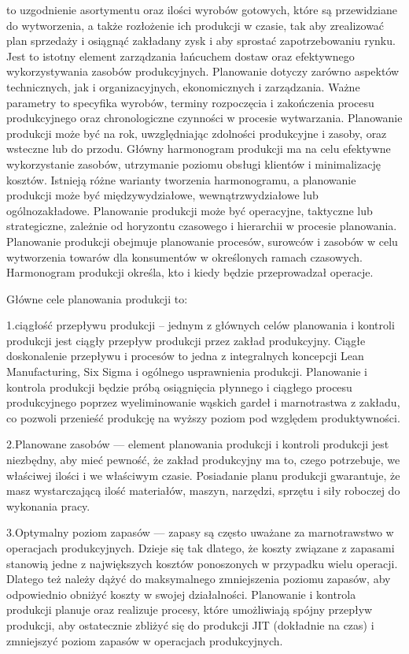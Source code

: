 to uzgodnienie asortymentu oraz ilości wyrobów gotowych, które są przewidziane do wytworzenia, a także rozłożenie ich produkcji w czasie, tak aby zrealizować plan sprzedaży i osiągnąć zakładany zysk i aby sprostać zapotrzebowaniu rynku. Jest to istotny element zarządzania łańcuchem dostaw oraz efektywnego wykorzystywania zasobów produkcyjnych.
Planowanie dotyczy zarówno aspektów technicznych, jak i organizacyjnych, ekonomicznych i zarządzania. Ważne parametry to specyfika wyrobów, terminy rozpoczęcia i zakończenia procesu produkcyjnego oraz chronologiczne czynności w procesie wytwarzania. Planowanie produkcji może być na rok, uwzględniając zdolności produkcyjne i zasoby, oraz wsteczne lub do przodu. Główny harmonogram produkcji ma na celu efektywne wykorzystanie zasobów, utrzymanie poziomu obsługi klientów i minimalizację kosztów. Istnieją różne warianty tworzenia harmonogramu, a planowanie produkcji może być międzywydziałowe, wewnątrzwydziałowe lub ogólnozakładowe. Planowanie produkcji może być operacyjne, taktyczne lub strategiczne, zależnie od horyzontu czasowego i hierarchii w procesie planowania. 
Planowanie produkcji obejmuje planowanie procesów, surowców i zasobów w celu wytworzenia towarów dla konsumentów w określonych ramach czasowych. Harmonogram produkcji określa, kto i kiedy będzie przeprowadzał operacje.


Główne cele planowania produkcji to:

1.ciągłość przepływu produkcji – jednym z głównych celów planowania i kontroli produkcji jest ciągły przepływ produkcji przez zakład produkcyjny. Ciągłe doskonalenie przepływu i procesów to jedna z integralnych koncepcji Lean Manufacturing, Six Sigma i ogólnego usprawnienia produkcji. Planowanie i kontrola produkcji będzie próbą osiągnięcia płynnego i ciągłego procesu produkcyjnego poprzez wyeliminowanie wąskich gardeł i marnotrastwa z zakładu, co pozwoli  przenieść produkcję na wyższy poziom pod względem produktywności.

2.Planowane zasobów — element planowania produkcji i kontroli produkcji jest niezbędny, aby mieć pewność, że  zakład produkcyjny ma to, czego potrzebuje, we właściwej ilości i we właściwym czasie. Posiadanie planu produkcji gwarantuje, że masz wystarczającą ilość materiałów, maszyn, narzędzi, sprzętu i siły roboczej do wykonania pracy.


3.Optymalny poziom zapasów — zapasy są często uważane za marnotrawstwo w operacjach produkcyjnych. Dzieje się tak dlatego, że koszty związane z zapasami stanowią jedne z największych kosztów ponoszonych w przypadku wielu operacji. Dlatego też należy dążyć do maksymalnego zmniejszenia poziomu zapasów, aby odpowiednio obniżyć koszty w swojej działalności. Planowanie i kontrola produkcji planuje oraz realizuje procesy, które umożliwiają spójny przepływ produkcji, aby ostatecznie zbliżyć się do produkcji JIT (dokładnie na czas) i zmniejszyć poziom zapasów w operacjach produkcyjnych.

